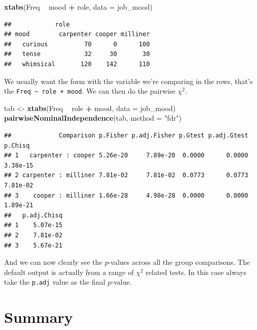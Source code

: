\documentclass[
]{book}
\newenvironment{Shaded}{\begin{snugshade}}{\end{snugshade}}
\newcommand{\DataTypeTok}[1]{\textcolor[rgb]{0.13,0.29,0.53}{#1}}
\newcommand{\KeywordTok}[1]{\textcolor[rgb]{0.13,0.29,0.53}{\textbf{#1}}}
\newcommand{\NormalTok}[1]{#1}
\newcommand{\OperatorTok}[1]{\textcolor[rgb]{0.81,0.36,0.00}{\textbf{#1}}}
\newcommand{\StringTok}[1]{\textcolor[rgb]{0.31,0.60,0.02}{#1}}
\begin{document}
\begin{Shaded}
\begin{Highlighting}[]
\KeywordTok{xtabs}\NormalTok{(Freq }\OperatorTok{~}\StringTok{ }\NormalTok{mood }\OperatorTok{+}\StringTok{ }\NormalTok{role, }\DataTypeTok{data =}\NormalTok{ job_mood)}
\end{Highlighting}
\end{Shaded}

\begin{verbatim}
##            role
## mood        carpenter cooper milliner
##   curious          70      0      100
##   tense            32     30       30
##   whimsical       120    142      110
\end{verbatim}

We usually want the form with the variable we're comparing in the rows, that's the \texttt{Freq\ \textasciitilde{}\ role\ +\ mood}. We can then do the pairwise \(\chi^2\).

\begin{Shaded}
\begin{Highlighting}[]
\NormalTok{tab <-}\StringTok{ }\KeywordTok{xtabs}\NormalTok{(Freq }\OperatorTok{~}\StringTok{ }\NormalTok{role }\OperatorTok{+}\StringTok{ }\NormalTok{mood, }\DataTypeTok{data =}\NormalTok{ job_mood)}
\KeywordTok{pairwiseNominalIndependence}\NormalTok{(tab, }\DataTypeTok{method =} \StringTok{"fdr"}\NormalTok{)}
\end{Highlighting}
\end{Shaded}

\begin{verbatim}
##             Comparison p.Fisher p.adj.Fisher p.Gtest p.adj.Gtest  p.Chisq
## 1   carpenter : cooper 5.26e-20     7.89e-20  0.0000      0.0000 3.38e-15
## 2 carpenter : milliner 7.81e-02     7.81e-02  0.0773      0.0773 7.81e-02
## 3    cooper : milliner 1.66e-28     4.98e-28  0.0000      0.0000 1.89e-21
##   p.adj.Chisq
## 1    5.07e-15
## 2    7.81e-02
## 3    5.67e-21
\end{verbatim}

And we can now clearly see the \(p\)-values across all the group comparisons. The default output is actually from a range of \(\chi^2\) related tests. In this case always take the \texttt{p.adj} value as the final \(p\)-value.

\hypertarget{summary}{%
\section{Summary}\label{summary}}
\end{document}
